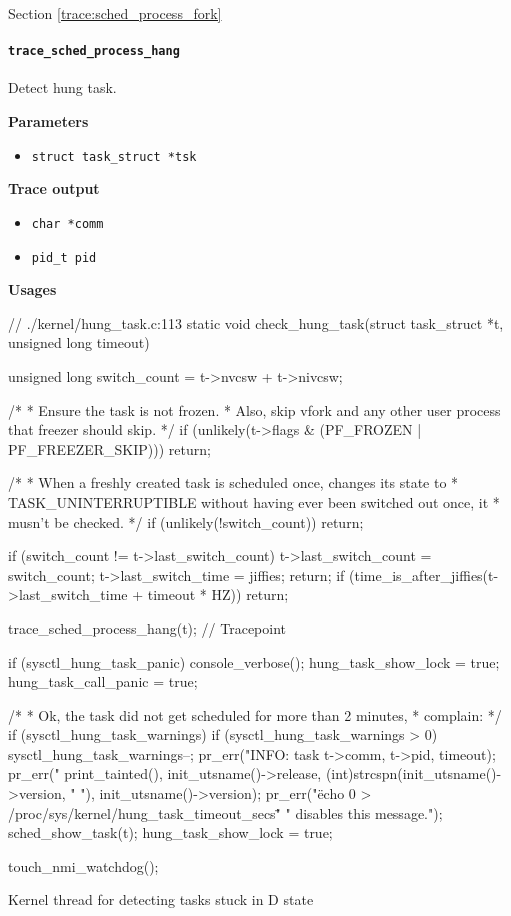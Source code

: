 Section \ref{trace:sched_process_fork}
    
\paragraph{\texttt{trace\_sched\_process\_hang}}
Detect hung task.

\textbf{Parameters}
\begin{itemize}
    \item \verb|struct task_struct *tsk|
\end{itemize}

\textbf{Trace output}
\begin{itemize}
    \item \verb|char *comm|
    \item \verb|pid_t pid|
\end{itemize}

\textbf{Usages}
\begin{code}
// ./kernel/hung_task.c:113
static void check_hung_task(struct task_struct *t, unsigned long timeout){
	unsigned long switch_count = t->nvcsw + t->nivcsw;

	/*
	 * Ensure the task is not frozen.
	 * Also, skip vfork and any other user process that freezer should skip.
	 */
	if (unlikely(t->flags & (PF_FROZEN | PF_FREEZER_SKIP)))
	    return;

	/*
	 * When a freshly created task is scheduled once, changes its state to
	 * TASK_UNINTERRUPTIBLE without having ever been switched out once, it
	 * musn't be checked.
	 */
	if (unlikely(!switch_count))
		return;

	if (switch_count != t->last_switch_count) {
		t->last_switch_count = switch_count;
		t->last_switch_time = jiffies;
		return;
	}
	if (time_is_after_jiffies(t->last_switch_time + timeout * HZ))
		return;

	trace_sched_process_hang(t); // Tracepoint

	if (sysctl_hung_task_panic) {
		console_verbose();
		hung_task_show_lock = true;
		hung_task_call_panic = true;
	}

	/*
	 * Ok, the task did not get scheduled for more than 2 minutes,
	 * complain:
	 */
	if (sysctl_hung_task_warnings) {
		if (sysctl_hung_task_warnings > 0)
			sysctl_hung_task_warnings--;
		pr_err("INFO: task %
			t->comm, t->pid, timeout);
		pr_err("      %
			print_tainted(), init_utsname()->release,
			(int)strcspn(init_utsname()->version, " "),
			init_utsname()->version);
		pr_err("\"echo 0 > /proc/sys/kernel/hung_task_timeout_secs\""
			" disables this message.\n");
		sched_show_task(t);
		hung_task_show_lock = true;
	}

	touch_nmi_watchdog();
}
\end{code}
Kernel thread for detecting tasks stuck in D state
  
